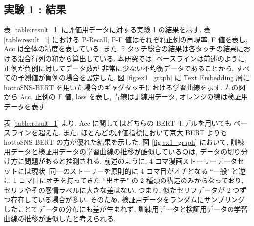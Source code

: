\begin{table}[!h]
\vspace{10mm}
\caption{損失関数におけるクラス重み}
\label{table:ex_class_weight}
\centering
{}
\end{table}

\newpage
\changeindent{0cm}
\subsection{実験 1 : 結果}
\changeindent{2cm}

表 \ref{table:result_1} に評価用データに対する実験 1 の結果を示す. 表 \ref{table:result_1} における P-Recall, P-F 値はそれぞれ正例の再現率, F 値を表し, Acc は全体の精度を表している. また, 5 タッチ総合の結果は各タッチの結果における混合行列の和から算出している.
本研究では, ベースラインは前述のように, 正例が負例に対してデータ数が
非常に少ない不均衡データであることから, すべての予測値が負例の場合を設定した.
図 \ref{fig:ex1_graph} に Text Embedding 層に hottoSNS-BERT を用いた場合のギャグタッチにおける学習曲線を示す. 左の図から Acc, 正例の F 値, loss を表し, 青線は訓練用データ, オレンジの線は検証用データを表す.

表 \ref{table:result_1} より, Acc に関してはどちらの BERT モデルを用いても
ベースラインを超えた. また, ほとんどの評価指標において京大 BERT よりも hottoSNS-BERT の方が優れた結果を示した. 図 \ref{fig:ex1_graph} において, 訓練用データと検証用データの学習曲線の推移が酷似しているのは, データの切り分け方に問題があると推測される. 前述のように, 4 コマ漫画ストーリーデータセットには現状, 同一のストーリーを原則的に 4 コマ目がオチとなる ``一般" と逆に 1 コマ目にオチを持ってきた ``出オチ" の 2 種類の構造のみからなっており, セリフやその感情ラベルに大きな差はない. つまり, 似たセリフデータが 2 つずつ存在している場合が多い. そのため, 検証用データをランダムにサンプリングしたことでデータの分布にも差が生まれず, 訓練用データと検証用データの学習曲線の推移が酷似したと考えられる.

